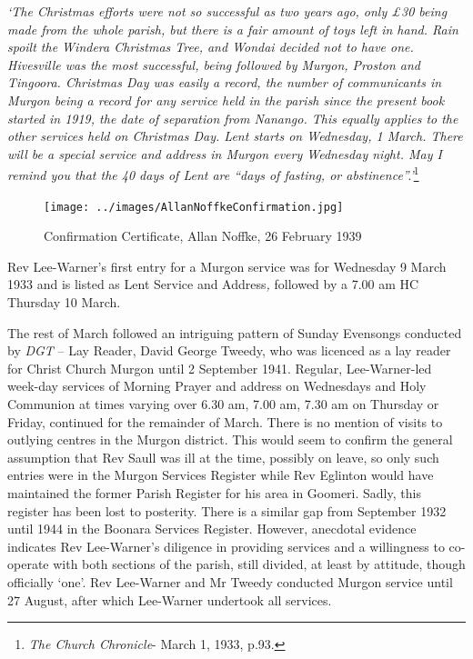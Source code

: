\emph{`The Christmas efforts were not so successful as two years ago, only \pounds30 being made from the whole parish, but there is a fair amount of toys left in hand. Rain spoilt the Windera Christmas Tree, and Wondai decided not to have one. Hivesville was the most successful, being followed by Murgon, Proston and Tingoora. Christmas Day was easily a record, the number of communicants in Murgon being a record for any service held in the parish since the present book started in 1919, the date of separation from Nanango. This equally applies to the other services held on Christmas Day. Lent starts on Wednesday, 1 March. There will be a special service and address in Murgon every Wednesday night. May I remind you that the 40 days of Lent are ``days of fasting, or abstinence''.'}\footnote{\emph{The Church Chronicle}- March 1, 1933, p.93.}


\medskip








\begin{figure}[!htb]
\begin{center}
\texttt{[image: ../images/AllanNoffkeConfirmation.jpg]}
\caption{Confirmation Certificate, Allan Noffke, 26 February 1939}
\end{center}
\end{figure}




Rev Lee-Warner's first entry for a Murgon service was for Wednesday 9 March 1933 and is listed as Lent Service and Address\emph{,} followed by a 7.00 am HC Thursday 10 March.



The rest of March followed an intriguing pattern of Sunday Evensongs conducted by \emph{DGT} -- Lay Reader, David George Tweedy, who was licenced as a lay reader for Christ Church Murgon until 2 September 1941. Regular, Lee-Warner-led week-day services of Morning Prayer and address on Wednesdays and Holy Communion at times varying over 6.30 am, 7.00 am, 7.30 am on Thursday or Friday, continued for the remainder of March. There is no mention of visits to outlying centres in the Murgon district. This would seem to confirm the general assumption that Rev Saull was ill at the time, possibly on leave, so only such entries were in the Murgon Services Register while Rev Eglinton would have maintained the former Parish Register for his area in Goomeri. Sadly, this register has been lost to posterity. There is a similar gap from September 1932 until 1944 in the Boonara Services Register. However, anecdotal evidence indicates Rev Lee-Warner's diligence in providing services and a willingness to co-operate with both sections of the parish, still divided, at least by attitude, though officially `one'. Rev Lee-Warner and Mr Tweedy conducted Murgon service until 27 August, after which Lee-Warner undertook all services.




